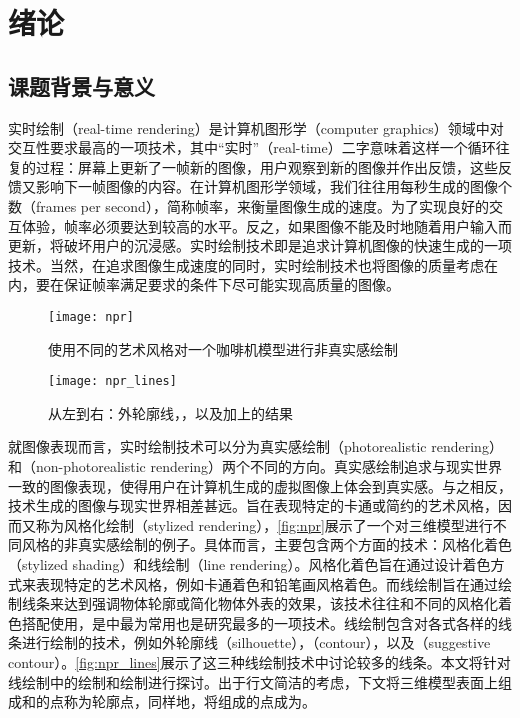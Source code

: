 \chapter{绪论}

\section{课题背景与意义}

实时绘制（real-time rendering）是计算机图形学（computer graphics）领域中对交互性要求最高的一项技术，其中“实时”（real-time）二字意味着这样一个循环往复的过程：屏幕上更新了一帧新的图像，用户观察到新的图像并作出反馈，这些反馈又影响下一帧图像的内容。在计算机图形学领域，我们往往用每秒生成的图像个数（frames per second），简称帧率，来衡量图像生成的速度。为了实现良好的交互体验，帧率必须要达到较高的水平。反之，如果图像不能及时地随着用户输入而更新，将破坏用户的沉浸感。实时绘制技术即是追求计算机图像的快速生成的一项技术。当然，在追求图像生成速度的同时，实时绘制技术也将图像的质量考虑在内，要在保证帧率满足要求的条件下尽可能实现高质量的图像。

\begin{figure}[tbh]
    \centering
    \texttt{[image: npr]}
    \caption[使用不同的艺术风格进行非真实感绘制]{\label{fig:npr}
    使用不同的艺术风格对一个咖啡机模型进行非真实感绘制\cite{akenine2018real}}
\end{figure}

\begin{figure}[tbh]
    \centering
    \texttt{[image: npr\_lines]}
    \caption[外轮廓线，\con{}，以及\con{}加上\scon{}的结果]{\label{fig:npr_lines}
    从左到右：外轮廓线，\con{}，以及\con{}加上\scon{}的结果\cite{akenine2018real}}
\end{figure}

就图像表现而言，实时绘制技术可以分为真实感绘制（photorealistic rendering）和\npr{}（non-photorealistic rendering）两个不同的方向。真实感绘制追求与现实世界一致的图像表现，使得用户在计算机生成的虚拟图像上体会到真实感。与之相反，\npr{}技术生成的图像与现实世界相差甚远。\npr{}旨在表现特定的卡通或简约的艺术风格，因而又称为风格化绘制（stylized rendering），\autoref{fig:npr}展示了一个对三维模型进行不同风格的非真实感绘制的例子。具体而言，\npr{}主要包含两个方面的技术：风格化着色（stylized shading）和线绘制（line rendering）。风格化着色旨在通过设计着色方式来表现特定的艺术风格，例如卡通着色和铅笔画风格着色。而线绘制旨在通过绘制线条来达到强调物体轮廓或简化物体外表的效果，该技术往往和不同的风格化着色搭配使用，是\npr{}中最为常用也是研究最多的一项技术。线绘制包含对各式各样的线条进行绘制的技术，例如外轮廓线（silhouette），\con{}（contour），以及\scon{}（suggestive contour）。\autoref{fig:npr_lines}展示了这三种线绘制技术中讨论较多的线条。本文将针对线绘制中的\con{}绘制和\scon{}绘制进行探讨。出于行文简洁的考虑，下文将三维模型表面上组成\con{}和\scon{}的点称为轮廓点，同样地，将组成\vdl{}的点成为\vdp{}。

